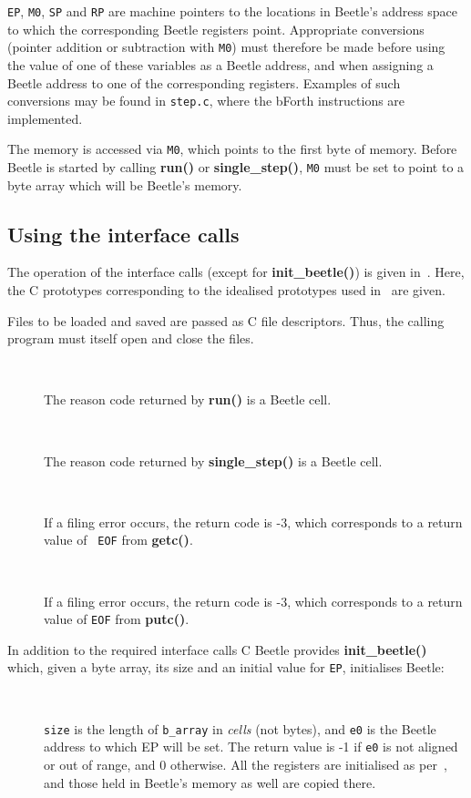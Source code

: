 \documentclass{article}
\newlength{\ifacewidth}\ifacewidth=\textwidth \advance\ifacewidth by -0.1in
\newlength{\innerwidth}\innerwidth=\ifacewidth \advance\innerwidth by -0.5in
\newcommand{\ifacec}[2]{\item[]\parbox{\ifacewidth}{\hspace*{2.5mm}{\tt #1}\\[0.5ex]\hspace*{0.4in}\parbox{\innerwidth}{#2}}}
\begin{document}
{\tt EP}, {\tt M0}, {\tt SP} and {\tt RP} are machine pointers to the
locations in Beetle's address space to which the corresponding Beetle
registers point. Appropriate conversions (pointer addition or subtraction
with {\tt M0}) must therefore be made before using the value of one of these
variables as a Beetle address, and when assigning a Beetle address to one of
the corresponding registers. Examples of such conversions may be found in
{\tt step.c}, where the bForth instructions are implemented.

The memory is accessed via {\tt M0}, which points to the first byte of
memory. Before Beetle is started by calling {\bf run()} or {\bf
single\_step()}, {\tt M0} must be set to point to a byte array which will be
Beetle's memory.


\subsection{Using the interface calls}
\label{usingcalls}

The operation of the interface calls (except for {\bf init\_beetle()}) is
given in~\cite{beetle}. Here, the C prototypes corresponding to the idealised
prototypes used in~\cite{beetle} are given.

Files to be loaded and saved are passed as C file descriptors. Thus, the
calling program must itself open and close the files.

\begin{description}
\ifacec{CELL run()}{The reason code returned by {\bf run()} is a Beetle
cell.}
\ifacec{CELL single\_step()}{The reason code returned by {\bf single\_step()}
is a Beetle cell.}
\ifacec{int load\_object(FILE *file, CELL *address)}{If a filing error
occurs, the return code is -3, which corresponds to a return value of {\tt
EOF} from {\bf getc()}.}
\ifacec{int save\_object(FILE *file, CELL *address, UCELL length)}{If a
filing error occurs, the return code is -3, which corresponds to a return
value of {\tt EOF} from {\bf putc()}.}
\end{description}

In addition to the required interface calls C Beetle provides {\bf
init\_beetle()} which, given a byte array, its size and an initial value for
{\tt EP}, initialises Beetle:

\begin{description}
\ifacec{int init\_beetle(BYTE *b\_array, long size, UCELL e0)}{{\tt size} is
the length of {\tt b\_array} in {\em cells} (not bytes), and {\tt e0} is the
Beetle address to which EP will be set. The return value is -1 if {\tt e0} is
not aligned or out of range, and 0 otherwise. All the registers are
initialised as per~\cite{beetle}, and those held in Beetle's memory as well
are copied there.}
\end{description}
\end{document}
